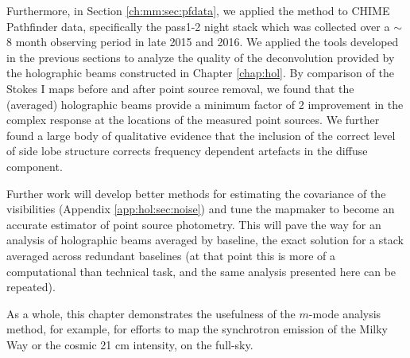 Furthermore, in Section \ref{ch:mm:sec:pfdata}, we applied the method to CHIME Pathfinder data, specifically the pass1-2 night stack which was collected over a $\sim$8 month observing period in late 2015 and 2016. We applied the tools developed in the previous sections to analyze the quality of the deconvolution provided by the holographic beams constructed in Chapter \ref{chap:hol}. By comparison of the Stokes I maps before and after point source removal, we found that the (averaged) holographic beams provide a minimum factor of 2 improvement in the complex response at the locations of the measured point sources. We further found a large body of qualitative evidence that the inclusion of the correct level of side lobe structure corrects frequency dependent artefacts in the diffuse component.

Further work will develop better methods for estimating the covariance of the visibilities (Appendix \ref{app:hol:sec:noise}) and tune the mapmaker to become an accurate estimator of point source photometry. This will pave the way for an analysis of holographic beams averaged by baseline, the exact solution for a stack averaged across redundant baselines (at that point this is more of a computational than technical task, and the same analysis presented here can be repeated).

As a whole, this chapter demonstrates the usefulness of the $m$-mode analysis method, for example, for efforts to map the synchrotron emission of the Milky Way \cite{eastwoodetal} or the cosmic 21 cm intensity, on the full-sky.





